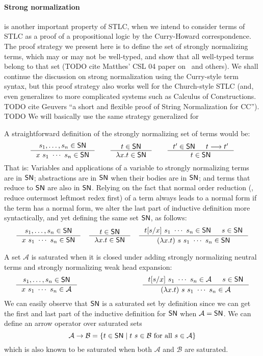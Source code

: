 \paragraph{Strong normalization} is another important property of STLC,
when we intend to consider terms of STLC as a proof of a propositional logic
by the Curry-Howard correspondence. The proof strategy we present here is
to define the set of strongly normalizing terms, which may or may not be
well-typed, and show that all well-typed terms belong to that set
(TODO cite Matthes' CSL 04 paper on \Fixw\ and others).
We shall continue the discussion on strong normalization using
the Curry-style term syntax, but this proof strategy also works well
for the Church-style STLC (and, even generalizes to more complicated systems
such as Calculus of Constructions.
TODO cite Geuvers ``a short and flexible proof of String Normalization for CC'').
TODO We will basically use the same strategy generalized for 

A straightforward definition of the strongly normalizing set of terms would be:
\[
\inference{s_1,\ldots,s_n\in\SN}{x~s_1~\cdots~s_n \in \SN}
\qquad
\inference{t \in \SN}{\l x.t \in \SN}
\qquad
\inference{t' \in \SN & t --> t'}{t \in \SN}
\]
That is:
Variables and applications of a variable to strongly normalizing terms are
in $\mathsf{SN}$; abstractions are in $\mathsf{SN}$ when their bodies are in $\mathsf{SN}$; and
terms that reduce to $\mathsf{SN}$ are also in $\mathsf{SN}$.
Relying on the fact that normal order reduction (\ie, reduce outermost
leftmost redex first) of a term always leads to a normal form if the term
has a normal form, we alter the last part of inductive definition
more syntactically, and yet defining the same set $\mathsf{SN}$, as follows:
\[
\inference{s_1,\ldots,s_n\in\SN}{x~s_1~\cdots~s_n \in \SN}
\quad
\inference{t \in \SN}{\l x.t \in \SN}
\quad
\inference{t[s/x]~s_1~\cdots~s_n\in \SN & s\in\SN}
	{(\lambda x.t)~s~s_1~\cdots~s_n \in \SN}
\]

A set $\mathcal{A}$ is saturated when it is closed under adding
strongly normalizing neutral terms and strongly normalizing weak head expansion:
\[
\inference{s_1,\ldots,s_n\in\SN}{x~s_1~\cdots~s_n \in \mathcal{A}}
\qquad\qquad\qquad\qquad\quad
\inference{t[s/x]~s_1~\cdots~s_n\in \mathcal{A} & s\in\SN}
	  {(\l x.t)~s~s_1~\cdots~s_n \in \mathcal{A}}
\]
We can easily observe that $\mathsf{SN}$ is a saturated set by definition
since we can get the first and last part of the inductive definition for $\mathsf{SN}$
when $\mathcal{A}=\mathsf{SN}$. We can define an arrow operator over saturated sets
\[ \mathcal{A} -> \mathcal{B} = \{ t \in \mathsf{SN} \mid t~s \in \mathcal{B} ~\text{for all}~ s \in \mathcal{A} \} \]
which is also known to be saturated when both $\mathcal{A}$ and $\mathcal{B}$
are saturated.

